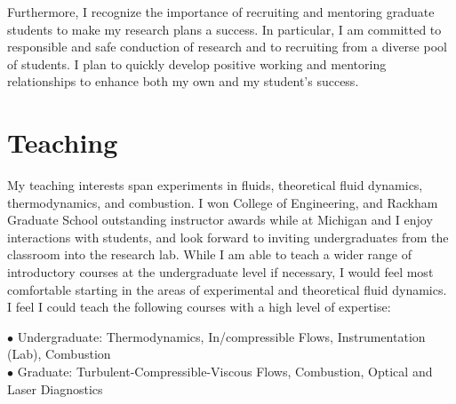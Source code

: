 \documentclass[11pt,a4paper,sans]{moderncv/moderncv} %
\begin{document}
Furthermore, I recognize the importance of recruiting and mentoring graduate students to make my research plans a success. In particular, I am committed to responsible and safe conduction of research and to recruiting from a diverse pool of students. I plan to quickly develop positive working and mentoring relationships to enhance both my own and my student's success. %
\section{Teaching}
My teaching interests span experiments in fluids, theoretical fluid dynamics, thermodynamics, and combustion.  I won College of Engineering, and Rackham Graduate School outstanding instructor awards while at Michigan and I enjoy interactions with students, and look forward to inviting undergraduates from the classroom into the research lab. While I am able to teach a wider range of introductory courses at the undergraduate level if necessary, I would feel most comfortable starting in the areas of experimental and theoretical fluid dynamics. I feel I could teach the following courses with a high level of expertise:

$\bullet{}$ Undergraduate: Thermodynamics, In/compressible Flows, Instrumentation (Lab), Combustion\\
$\bullet{}$ Graduate: Turbulent-Compressible-Viscous Flows, Combustion, Optical and Laser Diagnostics
\end{document}
